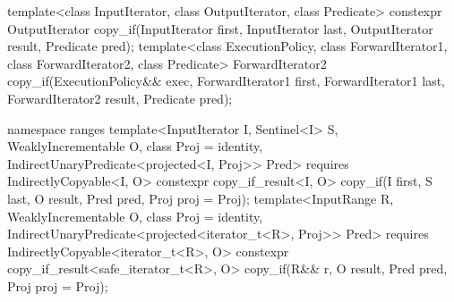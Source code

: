 %
\begin{itemdecl}
template<class InputIterator, class OutputIterator, class Predicate>
  constexpr OutputIterator copy_if(InputIterator first, InputIterator last,
                                   OutputIterator result, Predicate pred);
template<class ExecutionPolicy, class ForwardIterator1, class ForwardIterator2,
         class Predicate>
  ForwardIterator2 copy_if(ExecutionPolicy&& exec,
                           ForwardIterator1 first, ForwardIterator1 last,
                           ForwardIterator2 result, Predicate pred);
\end{itemdecl}
\begin{addedblock}\begin{itemdecl}
namespace ranges {
  template<InputIterator I, Sentinel<I> S, WeaklyIncrementable O, class Proj = identity,
      IndirectUnaryPredicate<projected<I, Proj>> Pred>
    requires IndirectlyCopyable<I, O>
    constexpr copy_if_result<I, O>
      copy_if(I first, S last, O result, Pred pred, Proj proj = Proj{});
  template<InputRange R, WeaklyIncrementable O, class Proj = identity,
      IndirectUnaryPredicate<projected<iterator_t<R>, Proj>> Pred>
    requires IndirectlyCopyable<iterator_t<R>, O>
    constexpr copy_if_result<safe_iterator_t<R>, O>
      copy_if(R&& r, O result, Pred pred, Proj proj = Proj{});
}
\end{itemdecl}\end{addedblock}

